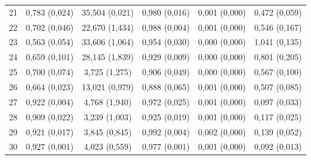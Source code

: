 \begin{tabular}{l c c c c c}
21 & 0,783 (0,024) & 35,504 (0,021) & 0,980 (0,016) & 0,001 (0,000) & 0,472 (0,059) \\
22 & 0,702 (0,046) & 22,670 (1,434) & 0,988 (0,004) & 0,001 (0,000) & 0,546 (0,167) \\
23 & 0,563 (0,054) & 33,606 (1,064) & 0,954 (0,030) & 0,000 (0,000) & 1,041 (0,135) \\
24 & 0,659 (0,101) & 28,145 (1,839) & 0,929 (0,009) & 0,000 (0,000) & 0,801 (0,205) \\
25 & 0,700 (0,074) & 3,725 (1,275) & 0,906 (0,049) & 0,000 (0,000) & 0,567 (0,100) \\
26 & 0,664 (0,023) & 13,021 (0,979) & 0,888 (0,065) & 0,001 (0,000) & 0,507 (0,085) \\
27 & 0,922 (0,004) & 4,768 (1,940) & 0,972 (0,025) & 0,001 (0,000) & 0,097 (0,033) \\
28 & 0,909 (0,022) & 3,239 (1,003) & 0,925 (0,019) & 0,001 (0,000) & 0,117 (0,025) \\
29 & 0,921 (0,017) & 3,845 (0,845) & 0,992 (0,004) & 0,002 (0,000) & 0,139 (0,052) \\
30 & 0,927 (0,001) & 4,023 (0,559) & 0,977 (0,001) & 0,001 (0,000) & 0,092 (0,013) \\
\hline 
 \end{tabular}
